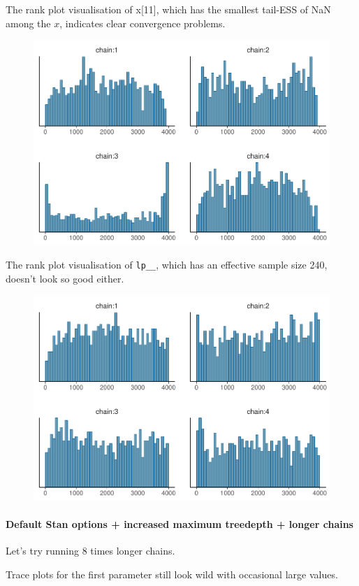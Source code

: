 \documentclass[american,]{article}
\let\oldparagraph\paragraph
\renewcommand{\paragraph}[1]{\oldparagraph{#1}\mbox{}}
\begin{document}
The rank plot visualisation of x{[}11{]}, which has the smallest
tail-ESS of NaN among the \(x\), indicates clear convergence problems.

\begin{figure}[tp]
  \centering
  \includegraphics[width=0.6\linewidth]{graphics/hist-fit-nom-td20-1.pdf}
\end{figure}

The rank plot visualisation of \texttt{lp\_\_}, which has an effective
sample size 240, doesn't look so good either.

\begin{figure}[tp]
  \centering
  \includegraphics[width=0.6\linewidth]{graphics/hist-fit-nom-td20-lp-1.pdf}
\end{figure}

\hypertarget{default-stan-options-increased-maximum-treedepth-longer-chains}{%
\paragraph{Default Stan options + increased maximum treedepth + longer
chains}\label{default-stan-options-increased-maximum-treedepth-longer-chains}}

Let's try running 8 times longer chains.

Trace plots for the first parameter still look wild with occasional
large values.
\end{document}
